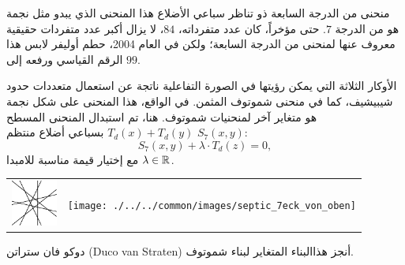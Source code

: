 \begin{surferPage}[7-gon]{منحنى من الدرجة السابعة ذو تناظر سباعي الأضلاع}
هذا المنحنى الذي يبدو مثل نجمة هو من الدرجة $7$. 
   حتى مؤخراً، كان عدد متفرداته، $84$، لا يزال أكبر عدد متفردات حقيقية معروف عنها لمنحنى من الدرجة السابعة؛ 
   ولكن في العام 2004، حطم أوليفر لابس هذا الرقم القياسي ورفعه إلى $99$.  
  
    الأوكار الثلاثة التي يمكن رؤيتها في الصورة التفاعلية ناتجة عن استعمال متعددات حدود شيبيشيف، كما في منحنى شموتوف المثمن.  
    في الواقع، هذا المنحنى على شكل نجمة هو متغاير آخر لمنحنيات شموتوف.
    هنا، تم استبدال المنحنى المسطح $T_d(x)+T_d(y)$ بسباعي أضلاع منتظم $S_7(x,y)$: 
   \[S_7(x,y) + \lambda \cdot T_d(z) = 0,\]
   مع إختيار قيمة مناسبة للامبدا  $\lambda\in{\mathbb R}$. 
    \vspace*{-0.3em}
    \begin{center}
      \begin{tabular}{c@{\qquad}c}
        \includegraphics[height=1.5cm]{./../../common/images/labsseptic1.pdf}
        &
        \texttt{[image: ./../../common/images/septic\_7eck\_von\_oben]}
      \end{tabular}
    \end{center}
    \vspace*{-0.3em}   
    دوكو فان ستراتن
     \textenglish{(Duco van Straten)}
      أنجز هذاالبناء المتغاير لبناء شموتوف.
\end{surferPage}
